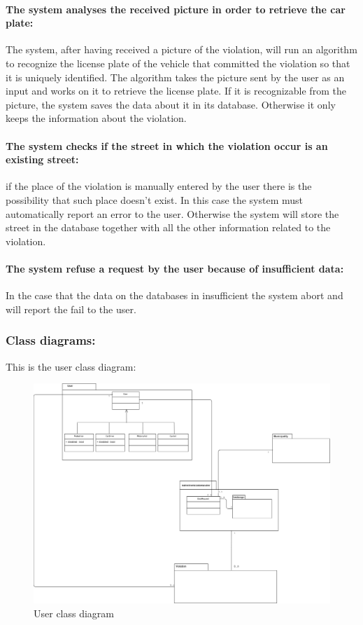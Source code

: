 \documentclass[titlepage]{article}
\begin{document}
\paragraph{The system analyses the received picture in order to 	retrieve the car plate: }
The system, after having received a picture of the violation, will run an algorithm to recognize the license plate of the vehicle that committed the violation so that it is uniquely identified. The algorithm takes the picture sent by the user as an input and works on it to retrieve the license plate. If it is recognizable from the picture, the system saves the data about it in its database. Otherwise it only keeps the information about the violation.
\paragraph{The system checks if the street in which the 				violation occur is an existing street: }
if the place of the violation is manually entered by the user there is the possibility that such place doesn't exist. In this case the system must automatically report an error to the user. Otherwise the system will store the street in the database together with all the other information related to the violation.
\paragraph{The system refuse a request by the user because of 
	insufficient data:}
	In the case that the data on the databases in insufficient the system abort and will report the fail to the 
	user.
\subsubsection{Class diagrams:}
This is the user class diagram:
\begin{figure}[h
]
	\includegraphics[scale=0.3]{UML users v1.0.png}
	\centering
	\caption{User class diagram}
\end{figure}
\FloatBarrier
\end{document}
